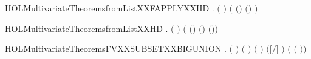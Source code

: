 \begin{SaveVerbatim}{HOLMultivariateTheoremsfromListXXFAPPLYXXHD}
\HOLTokenTurnstile{} \HOLSymConst{\HOLTokenForall{}}    .
       \HOLSymConst{\HOLTokenNeg{}}   \HOLSymConst{\HOLTokenConj{}}   \HOLSymConst{\HOLTokenConj{}} \ensuremath{(}  \HOLSymConst{\ensuremath{=}}  \ensuremath{)} \HOLSymConst{\HOLTokenImp{}}
       \ensuremath{(} \ensuremath{(}\HOLSymConst{::}\ensuremath{)} \ensuremath{(}\HOLSymConst{::}\ensuremath{)}   \HOLSymConst{\ensuremath{=}} \ensuremath{)}
\end{SaveVerbatim}
\newcommand{\HOLMultivariateTheoremsfromListXXFAPPLYXXHD}{\UseVerbatim{HOLMultivariateTheoremsfromListXXFAPPLYXXHD}}
\begin{SaveVerbatim}{HOLMultivariateTheoremsfromListXXHD}
\HOLTokenTurnstile{} \HOLSymConst{\HOLTokenForall{}}   .
       \HOLSymConst{\HOLTokenNeg{}}   \HOLSymConst{\HOLTokenConj{}} \ensuremath{(}  \HOLSymConst{\ensuremath{=}}  \ensuremath{)} \HOLSymConst{\HOLTokenImp{}}
       \ensuremath{(} \ensuremath{(}\HOLSymConst{::}\ensuremath{)} \ensuremath{(}\HOLSymConst{::}\ensuremath{)} \HOLSymConst{\ensuremath{=}}    \HOLSymConst{|+} \ensuremath{(}\HOLSymConst{,}\ensuremath{)}\ensuremath{)}
\end{SaveVerbatim}
\newcommand{\HOLMultivariateTheoremsfromListXXHD}{\UseVerbatim{HOLMultivariateTheoremsfromListXXHD}}
\begin{SaveVerbatim}{HOLMultivariateTheoremsFVXXSUBSETXXBIGUNION}
\HOLTokenTurnstile{} \HOLSymConst{\HOLTokenForall{}}  .
         \HOLSymConst{\HOLTokenConj{}} \ensuremath{(}  \HOLSymConst{\ensuremath{=}}  \ensuremath{)} \HOLSymConst{\HOLTokenConj{}}
        \ensuremath{(} \ensuremath{)} \ensuremath{(} \ensuremath{)} \HOLSymConst{\HOLTokenImp{}}
        \ensuremath{(}\ensuremath{[}\ensuremath{/}\ensuremath{]} \ensuremath{)} \HOLConst{\HOLTokenSubset{}}   \HOLConst{\HOLTokenUnion{}}  \ensuremath{(}  \ensuremath{(} \ensuremath{)}\ensuremath{)}
\end{SaveVerbatim}
